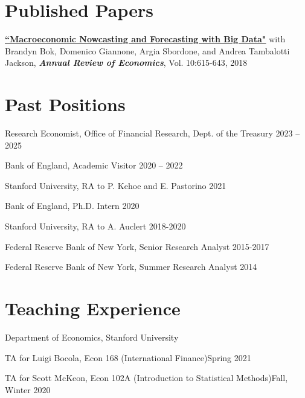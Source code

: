 \documentclass[margin,line]{res}                          %
\newenvironment{list1}{
	\begin{list}{\ding{113}}{%
			\setlength{\itemsep}{0in}
			\setlength{\parsep}{0in} \setlength{\parskip}{0in}
			\setlength{\topsep}{0in} \setlength{\partopsep}{0in}
			\setlength{\leftmargin}{0.17in}}}{\end{list}}
\begin{document}
\begin{resume}
	\section{\sc Published Papers}
	\begin{list1}
		\item[] \href{https://www.annualreviews.org/doi/abs/10.1146/annurev-economics-083120-111540}{\textbf{``Macroeconomic Nowcasting and Forecasting with Big Data"}} with  Brandyn Bok, Domenico Giannone, Argia Sbordone, and Andrea Tambalotti  Jackson, \textit{\textbf{Annual Review of Economics}}, Vol. 10:615-643, 2018 \smallskip
	\end{list1}
	
	
	\section{\sc Past Positions}
	\begin{list1}
		\item[] Research Economist, Office of Financial Research, Dept. of the Treasury \hfill 2023 -- 2025 \smallskip
		\item[] Bank of England, Academic Visitor \hfill 2020 -- 2022
		\smallskip
		\item[] Stanford University, RA to P. Kehoe and E. Pastorino \hfill 2021
		\smallskip
		\item[] Bank of England, Ph.D. Intern \hfill 2020
		\smallskip
		\item[] {Stanford University}, RA to A. Auclert  \hfill 2018-2020 \smallskip
		\item[] {Federal Reserve Bank of New York}, Senior Research Analyst \hfill 2015-2017 \smallskip
		\item[] {Federal Reserve Bank of New York}, Summer Research Analyst \hfill 2014 \smallskip
	\end{list1}
	
	
	\section{\sc Teaching Experience}
	\begin{list1}
		\item[] {Department of Economics, Stanford University} \smallskip
		\item[] TA for Luigi Bocola, Econ 168 (International Finance)\hfill Spring 2021\smallskip
		\item[] TA for Scott McKeon, Econ 102A (Introduction to Statistical Methods)\hfill Fall, Winter 2020\smallskip
	\end{list1}
	

\end{resume}
\end{document}
